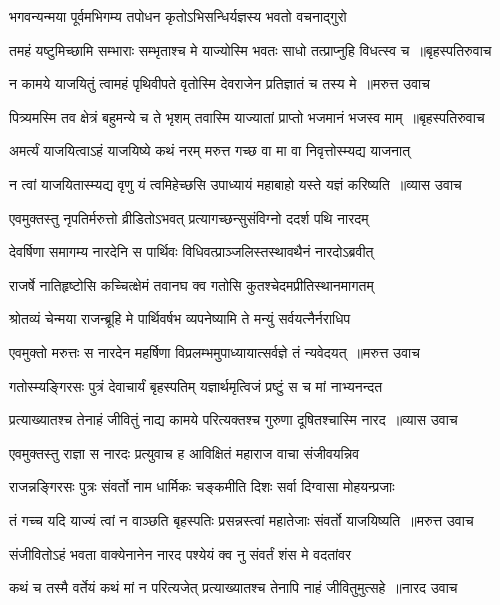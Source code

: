 \twolineshloka
{भगवन्यन्मया पूर्वमभिगम्य तपोधन}
{कृतोऽभिसन्धिर्यज्ञस्य भवतो वचनाद्गुरो}


\threelineshloka
{तमहं यष्टुमिच्छामि सम्भाराः सम्भृताश्च मे}
{याज्योस्मि भवतः साधो तत्प्राप्नुहि विधत्स्व च ॥बृहस्पतिरुवाच}
{}


\threelineshloka
{न कामये याजयितुं त्वामहं पृथिवीपते}
{वृतोस्मि देवराजेन प्रतिज्ञातं च तस्य मे ॥मरुत्त उवाच}
{}


\threelineshloka
{पित्र्यमस्मि तव क्षेत्रं बहुमन्ये च ते भृशम्}
{तवास्मि याज्यातां प्राप्तो भजमानं भजस्व माम् ॥बृहस्पतिरुवाच}
{}


\twolineshloka
{अमर्त्यं याजयित्वाऽहं याजयिष्ये कथं नरम्}
{मरुत्त गच्छ वा मा वा निवृत्तोस्म्यद्य याजनात्}


\threelineshloka
{न त्वां याजयितास्म्यद्य वृणु यं त्वमिहेच्छसि}
{उपाध्यायं महाबाहो यस्ते यज्ञं करिष्यति ॥व्यास उवाच}
{}


\twolineshloka
{एवमुक्तस्तु नृपतिर्मरुत्तो व्रीडितोऽभवत्}
{प्रत्यागच्छन्सुसंविग्नो ददर्श पथि नारदम्}


\twolineshloka
{देवर्षिणा समागम्य नारदेनि स पार्थिवः}
{विधिवत्प्राञ्जलिस्तस्थावथैनं नारदोऽब्रवीत्}


\twolineshloka
{राजर्षे नातिहृष्टोसि कच्चित्क्षेमं तवानघ}
{क्व गतोसि कुतश्चेदमप्रीतिस्थानमागतम्}


\twolineshloka
{श्रोतव्यं चेन्मया राजन्ब्रूहि मे पार्थिवर्षभ}
{व्यपनेष्यामि ते मन्युं सर्वयत्नैर्नराधिप}


\threelineshloka
{एवमुक्तो मरुत्तः स नारदेन महर्षिणा}
{विप्रलम्भमुपाध्यायात्सर्वज्ञे तं न्यवेदयत् ॥मरुत्त उवाच}
{}


\twolineshloka
{गतोस्म्यङ्गिरसः पुत्रं देवाचार्यं बृहस्पतिम्}
{यज्ञार्थमृत्विजं प्रष्टुं स च मां नाभ्यनन्दत}


\threelineshloka
{प्रत्याख्यातश्च तेनाहं जीवितुं नाद्य कामये}
{परित्यक्तश्च गुरुणा दूषितश्चास्मि नारद ॥व्यास उवाच}
{}


\twolineshloka
{एवमुक्तस्तु राज्ञा स नारदः प्रत्युवाच ह}
{आविक्षितं महाराज वाचा संजीवयन्निव}


\twolineshloka
{राजन्नङ्गिरसः पुत्रः संवर्तो नाम धार्मिकः}
{चङ्कमीति दिशः सर्वा दिग्वासा मोहयन्प्रजाः}


\threelineshloka
{तं गच्च यदि याज्यं त्वां न वाञ्छति बृहस्पतिः}
{प्रसन्नस्त्वां महातेजाः संवर्तो याजयिष्यति ॥मरुत्त उवाच}
{}


\twolineshloka
{संजीवितोऽहं भवता वाक्येनानेन नारद}
{पश्येयं क्व नु संवर्तं शंस मे वदतांवर}


\threelineshloka
{कथं च तस्मै वर्तेयं कथं मां न परित्यजेत्}
{प्रत्याख्यातश्च तेनापि नाहं जीवितुमुत्सहे ॥नारद उवाच}
{}


